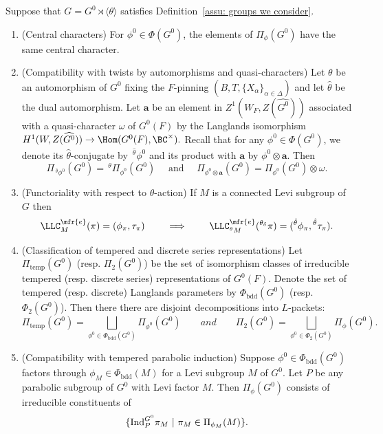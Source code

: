 \documentclass[11pt,letterpaper]{amsart}
\numberwithin{equation}{section}
\begin{document}
\begin{desideratum}\label{desideratum: LLC}
Suppose that $G= G^0 \rtimes \langle \theta \rangle$ satisfies Definition~\ref{assu: groups we consider}.

\begin{enumerate}
 \item[\CCh](Central characters) For $\phi^0 \in \Phi(G^0)$, the elements of $\Pi_{\phi}(G^0)$ have the same central character.

\item [\TW] (Compatibility with twists by automorphisms and quasi-characters) Let $\theta$ be an automorphism of $G^0$ fixing the $F$-pinning $(B, T, \{X_{\alpha}\}_{\alpha \in \Delta})$ and let $\hat{\theta}$ be the dual automorphism. Let $\mathbf{a}$ be an element in $Z^1(W_{F}, Z(\widehat{G^0}))$ associated with a quasi-character $\omega$ of $G^0(F)$ by the Langlands isomorphism
$
H^{1}(W, Z(\widehat{G^0})) \rightarrow \Hom(G^0(F), \BC^{\times}).
$
Recall that for any $\phi^0 \in \Phi(G^0)$, we denote its $\widehat{\theta}$-conjugate by $\,^{\widehat{\theta}} \phi^0$ and its product with $\mathbf{a}$ by $\phi^0 \otimes \mathbf{a}$. Then
\[
\Pi_{\,^{\widehat{\theta}}\phi^0}(G^0) = \,^\theta\Pi_{\phi^0}(G^0) \quad \text{ and } \quad  \Pi_{\phi^0 \otimes \mathbf{a}}(G^0) = \Pi_{\phi^0}(G^0) \otimes \omega.
\]

 \item [\Funtheta](Functoriality with respect to $\theta$-action)
If $M$ is a connected Levi subgroup of $G$ then 
\[
    \LLC^{\mfr{e}}_{M}(\pi)= (\phi_{\pi}, \tau_{\pi})
    \qquad\implies\qquad
    \LLC^{\mfr{e}}_{{}^\theta M}( {}^{\theta_{\delta}}{\pi})= ({}^{{\hat\theta}}\phi_{\pi}, {}^{{\hat\theta}}\tau_{\pi}).
\]

\item [\CTD] (Classification of tempered and discrete series representations)
Let $\Pi_{\mathrm{temp}}(G^0)$ (resp. $\Pi_{2}(G^0)$) be the set of isomorphism classes of irreducible tempered (resp. discrete series) representations of $G^0(F)$. Denote the set of tempered (resp. discrete) Langlands parameters by $\Phi_{\mathrm{bdd}}(G^0)$ (resp. $\Phi_2(G^0)$). Then there there are disjoint decompositions into $L$-packets:
\[
\Pi_{\mathrm{temp}}(G^0) = \bigsqcup_{\phi^0 \in \Phi_{\mathrm{bdd}}(G^0)} \Pi_{\phi^0}(G^0)
\qquad
and
\qquad
\Pi_{2}(G^0) = \bigsqcup_{\phi^0 \in \Phi_{2}(G^0)} \Pi_{\phi}(G^0).
\]

\item [\TI] (Compatibility with tempered parabolic induction) Suppose $\phi^0 \in \Phi_{\mathrm{bdd}}(G^0)$ factors through $\phi_{M} \in \Phi_{\mathrm{bdd}}(M)$ for a Levi subgroup $M$ of $G^0$. Let $P$ be any parabolic subgroup of $G^0$ with Levi factor $M$. Then $\Pi_{\phi}(G^0)$ consists of irreducible constituents of 
\[
\{{\rm Ind}^{G^0}_{P}  \pi_{M} \ | \ \pi_{M} \in \Pi_{\phi_{M}}(M)\}.
\]


\end{enumerate}
\end{desideratum}
\end{document}
